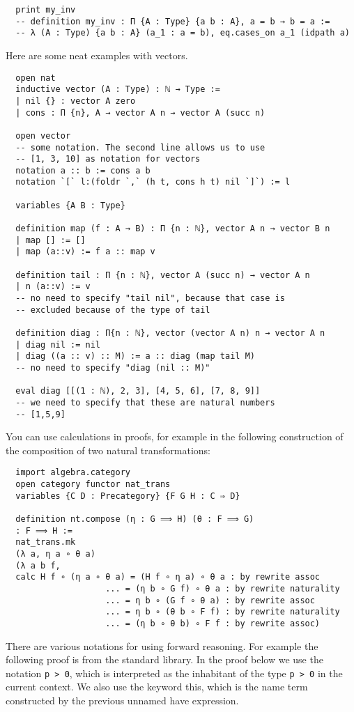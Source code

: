 \documentclass[12pt]{amsart}  %
\begin{document}
\begin{enumerate}
\begin{lstlisting}
  print my_inv
  -- definition my_inv : Π {A : Type} {a b : A}, a = b → b = a :=
  -- λ (A : Type) {a b : A} (a_1 : a = b), eq.cases_on a_1 (idpath a)
\end{lstlisting}
  Here are some neat examples with vectors.

\begin{lstlisting}
  open nat
  inductive vector (A : Type) : ℕ → Type :=
  | nil {} : vector A zero
  | cons : Π {n}, A → vector A n → vector A (succ n)
 
  open vector
  -- some notation. The second line allows us to use
  -- [1, 3, 10] as notation for vectors
  notation a :: b := cons a b
  notation `[` l:(foldr `,` (h t, cons h t) nil `]`) := l
 
  variables {A B : Type}
 
  definition map (f : A → B) : Π {n : ℕ}, vector A n → vector B n
  | map [] := []
  | map (a::v) := f a :: map v
 
  definition tail : Π {n : ℕ}, vector A (succ n) → vector A n
  | n (a::v) := v
  -- no need to specify "tail nil", because that case is
  -- excluded because of the type of tail
 
  definition diag : Π{n : ℕ}, vector (vector A n) n → vector A n
  | diag nil := nil
  | diag ((a :: v) :: M) := a :: diag (map tail M)
  -- no need to specify "diag (nil :: M)"
 
  eval diag [[(1 : ℕ), 2, 3], [4, 5, 6], [7, 8, 9]]
  -- we need to specify that these are natural numbers
  -- [1,5,9]
\end{lstlisting}

You can use calculations in proofs, for example in the following construction of the composition of two natural transformations:

\begin{lstlisting}
  import algebra.category
  open category functor nat_trans
  variables {C D : Precategory} {F G H : C ⇒ D}
 
  definition nt.compose (η : G ⟹ H) (θ : F ⟹ G)
  : F ⟹ H :=
  nat_trans.mk
  (λ a, η a ∘ θ a)
  (λ a b f,
  calc H f ∘ (η a ∘ θ a) = (H f ∘ η a) ∘ θ a : by rewrite assoc
                    ... = (η b ∘ G f) ∘ θ a : by rewrite naturality
                    ... = η b ∘ (G f ∘ θ a) : by rewrite assoc
                    ... = η b ∘ (θ b ∘ F f) : by rewrite naturality
                    ... = (η b ∘ θ b) ∘ F f : by rewrite assoc)
\end{lstlisting}

There are various notations for using forward reasoning. For example the following proof is from the standard library.
In the proof below we use the notation \lstinline{p > 0}, which is interpreted as the inhabitant of the type \lstinline{p > 0}
in the current context. We also use the keyword this, which is the name term constructed by the previous unnamed have expression.


\end{enumerate}
\end{document}
